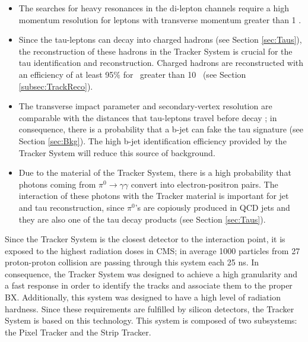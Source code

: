 \begin{itemize}
 \item The searches for heavy resonances in the di-lepton channels require a 
 high momentum resolution for leptons with transverse momentum greater than 1 \TeV. 
 \item Since the tau-leptons can decay into charged hadrons (see Section \ref{sec:Taus}), the 
 reconstruction of these hadrons in the Tracker System is crucial
 for the tau identification and reconstruction. Charged
 hadrons are reconstructed with an efficiency of at least 95$\%$ for \pt~greater than
 10 \GeV~(see Section \ref{subsec:TrackReco})\cite{TrackerPerformace}.
 \item The transverse impact parameter and secondary-vertex resolution are comparable with 
 the distances that tau-leptons travel before decay \cite{TauReconstructionCMSRun1}; 
 in consequence, there is a probability that a b-jet can fake 
 the tau signature (see Section \ref{sec:Bkg}). The 
 high b-jet identification efficiency provided by the Tracker System will reduce this source of background.
 \item Due to the material of the Tracker System, there is a high probability 
 that photons coming from $\pi^{0} \rightarrow \gamma\gamma$ convert into electron-positron 
 pairs. The interaction of these photons with the Tracker material is important for jet and tau reconstruction,
 since $\pi^{0}$'s are copiously produced in QCD jets and they are also one of the tau decay 
 products (see Section \ref{sec:Taus}).
 
\end{itemize}

\noindent Since the Tracker System is the closest detector to the interaction point, it is exposed 
to the highest radiation doses in CMS; in average 1000 particles from 27 proton-proton collision 
are passing through this system each 25 ns. In consequence, the Tracker System was designed to achieve a high granularity 
and a fast response in order to identify the tracks and associate them 
to the proper BX. Additionally, this system was designed to have a high level of radiation hardness. Since 
these requirements are fulfilled by silicon detectors, the Tracker System is based on 
this technology. This system is composed of two subsystems: the Pixel Tracker and the Strip Tracker. \\ 

